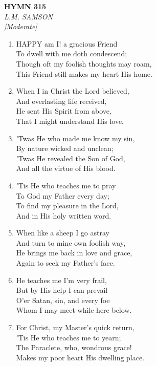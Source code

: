 \newpage
\begin{center}
    {\Large \textbf{HYMN 315}}
    \\
    \textit{L.M. SAMSON}
    \\
    \textit{\small [Moderate]}
\end{center}
\vspace{1em}

\begin{enumerate}
    \item HAPPY am I! a gracious Friend \\
        To dwell with me doth condescend; \\
        Though oft my foolish thoughts may roam, \\
        This Friend still makes my heart His home.

    \item When I in Christ the Lord believed, \\
        And everlasting life received, \\
        He sent His Spirit from above, \\
        That I might understand His love.

    \item 'Twas He who made me know my sin, \\
        By nature wicked and unclean; \\
        'Twas He revealed the Son of God, \\
        And all the virtue of His blood.

    \item 'Tis He who teaches me to pray \\
        To God my Father every day; \\
        To find my pleasure in the Lord, \\
        And in His holy written word.

    \item When like a sheep I go astray \\
        And turn to mine own foolish way, \\
        He brings me back in love and grace, \\
        Again to seek my Father's face.

    \item He teaches me I'm very frail, \\
        But by His help I can prevail \\
        O'er Satan, sin, and every foe \\
        Whom I may meet while here below.

    \item For Christ, my Master's quick return, \\
        'Tis He who teaches me to yearn; \\
        The Paraclete, who, wondrous grace! \\
        Makes my poor heart His dwelling place.

\end{enumerate}

